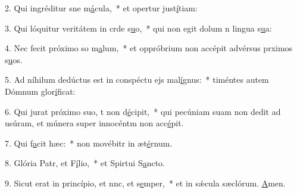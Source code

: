 2. Qui ingréditur sne m\uline{á}cula,~* et opertur just\uline{í}tiam:\par 
3. Qui lóquitur veritátem in crde s\uline{u}o,~* qui non egit dolum n lingua s\uline{u}a:\par 
4. Nec fecit próximo so m\uline{a}lum,~* et oppróbrium non accépit advérsus prximos s\uline{u}os.\par 
5. Ad níhilum dedúctus est in conspéctu ejs mal\uline{í}gnus:~* timéntes autem Dómnum glor\uline{í}ficat:\par 
6. Qui jurat próximo suo, t non d\uline{é}cipit,~* qui pecúniam suam non dedit ad usúram, et múnera super innocéntm non acc\uline{é}pit.\par 
7. Qui f\uline{a}cit hæc:~* non movébitr in æt\uline{é}rnum.\par 
8. Glória Patr, et F\uline{í}lio,~* et Spirtui S\uline{a}ncto.\par 
9. Sicut erat in princípio, et nnc, et s\uline{e}mper,~* et in sǽcula sæclórum. \uline{A}men.\par 
